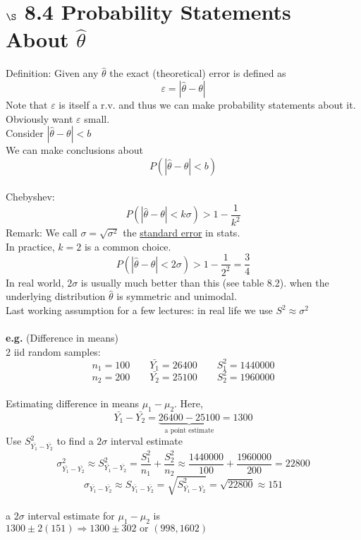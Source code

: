 \documentclass[12pt]{article}
\newcommand{\pars}[1]{\left( {#1} \right) }
\renewcommand{\over}[1]{\frac{1}{{#1}}}
\begin{document}
\section*{$\S$ 8.4 Probability Statements About $\hat{\theta}$}
Definition: Given any $\hat{\theta}$ the exact (theoretical) error is defined as
$$\varepsilon = \left| \hat{\theta} - \theta \right|$$
Note that $\varepsilon$ is itself a r.v. and thus we can make probability statements about it.
\vspace{0.2in}\\Obviously want $\varepsilon$ small.
\vspace{0.1in}\\Consider $\left| \hat{\theta} - \theta \right| < b$
\\We can make conclusions about
$$P\pars{\left| \hat{\theta} - \theta \right| < b}$$
\vspace{0.15in}\\
Chebyshev: $$P\pars{\left| \hat{\theta} - \theta \right| < k\sigma} > 1 - \over{k^2}$$
Remark: We call $\sigma = \sqrt{\sigma^2}$ the \underline{standard error} in stats.\vspace{0.1in}\\
In practice, $k = 2$ is a common choice.
$$P\pars{\left| \hat{\theta} - \theta \right| < 2\sigma} > 1 - \over{2^2} = \frac{3}{4}$$
In real world, $2\sigma$ is usually much better than this (see table 8.2). when the underlying distribution
$\hat{\theta}$ is symmetric and unimodal. \\
Last working assumption for a few lectures: in real life we use $S^2 \approx \sigma^2$\\\\
\textbf{e.g.} (Difference in means)\\

2 iid random samples:
$$n_1 = 100 \qquad \bar{Y_1} = 26400 \qquad S_1^2 = 1440000$$
$$n_2 = 200 \qquad \bar{Y_2} = 25100 \qquad S_2^2 = 1960000$$\vspace{0.05in}\\
Estimating difference in means $\mu_1 - \mu_2$. Here,
$$\bar{Y_1} - \bar{Y_2} = \underbrace{26400 - 25100}_{\text{a point estimate}} = 1300$$
Use $S^2_{\bar{Y_1} - \bar{Y_2}}$ to find a $2\sigma$ interval estimate
$$\sigma^2_{\bar{Y_1} - \bar{Y_2}} \approx S^2_{\bar{Y_1} - \bar{Y_2}} = \frac{S_1^2}{n_1} + \frac{S_2^2}{n_2} \approx \frac{1440000}{100} + \frac{1960000}{200} = 22800$$
$$\sigma_{\bar{Y_1} - \bar{Y_2}} \approx S_{\bar{Y_1} - \bar{Y_2}} = \sqrt{S_{\bar{Y_1} - \bar{Y_2}}^2} = \sqrt{22800} \approx 151$$
\\a $2\sigma$ interval estimate for $\mu_1 - \mu_2$ is $1300 \pm 2(151) \Rightarrow 1300 \pm 302 \text{ or } (998, 1602)$
\vspace{0.3in}
\end{document}
